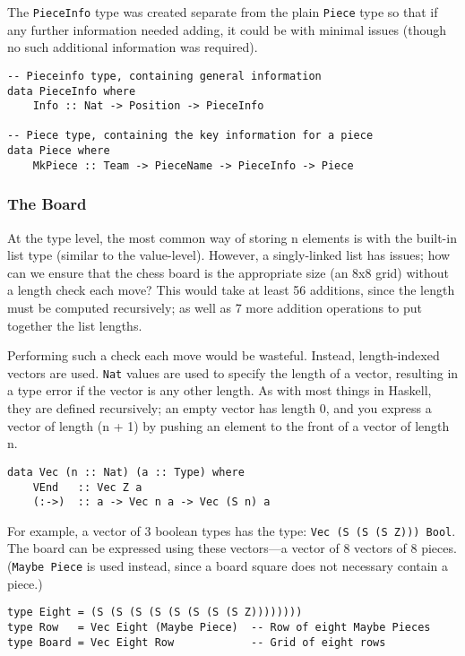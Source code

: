 \documentclass[12pt, a4paper]{scrartcl}
\begin{document}
The \lstinline{PieceInfo} type was created separate from the plain \lstinline{Piece} type so that if any further information needed adding, it could be with minimal issues (though no such additional information was required).

\begin{lstlisting}
-- Pieceinfo type, containing general information
data PieceInfo where
    Info :: Nat -> Position -> PieceInfo

-- Piece type, containing the key information for a piece
data Piece where
    MkPiece :: Team -> PieceName -> PieceInfo -> Piece
\end{lstlisting}

\subsubsection{The Board}

At the type level, the most common way of storing n elements is with the built-in list type (similar to the value-level). However, a singly-linked list has issues; how can we ensure that the chess board is the appropriate size (an 8x8 grid) without a length check each move? This would take at least 56 additions, since the length must be computed recursively; as well as 7 more addition operations to put together the list lengths.

Performing such a check each move would be wasteful. Instead, length-indexed vectors are used. \lstinline{Nat} values are used to specify the length of a vector, resulting in a type error if the vector is any other length. As with most things in Haskell, they are defined recursively; an empty vector has length 0, and you express a vector of length (n + 1) by pushing an element to the front of a vector of length n.

\begin{lstlisting}
data Vec (n :: Nat) (a :: Type) where
    VEnd   :: Vec Z a
    (:->)  :: a -> Vec n a -> Vec (S n) a
\end{lstlisting}

For example, a vector of 3 boolean types has the type: \lstinline{Vec (S (S (S Z))) Bool}. The board can be expressed using these vectors---a vector of 8 vectors of 8 pieces. (\lstinline{Maybe Piece} is used instead, since a board square does not necessary contain a piece.)

\begin{lstlisting}
type Eight = (S (S (S (S (S (S (S (S Z))))))))
type Row   = Vec Eight (Maybe Piece)  -- Row of eight Maybe Pieces
type Board = Vec Eight Row            -- Grid of eight rows
\end{lstlisting}
\end{document}
